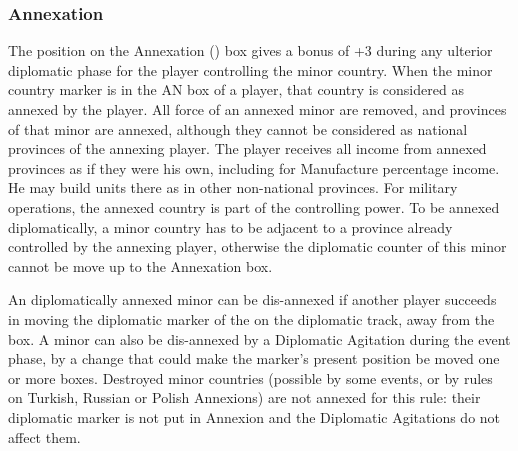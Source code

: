 \subsubsection{Annexation}
\aparag The position on the Annexation (\ANNEXION) box gives a bonus of +3
during any ulterior diplomatic phase for the player controlling the minor
country.  When the minor country marker is in the AN box of a player, that
country is considered as annexed by the player.
All force of an annexed minor are removed, and provinces of that minor are
annexed, although they cannot be considered as national provinces of the
annexing player.
\bparag The player receives all income from annexed provinces as if they were
his own, including for Manufacture percentage income.
\bparag He may build units there as in other non-national provinces.
\bparag For military operations, the annexed country is part of the
controlling power.
To be annexed diplomatically, a minor country has to be adjacent to a province
already controlled by the annexing player, otherwise the diplomatic counter of
this minor cannot be move up to the Annexation box.

An diplomatically annexed minor can be dis-annexed if another player succeeds
in moving the diplomatic marker of the \MIN on the diplomatic track, away from
the \ANNEXION box.
\bparag A minor can also be dis-annexed by a Diplomatic Agitation during the
event phase, by a change that could make the marker's present position be
moved one or more boxes.
\bparag Destroyed minor countries (possible by some events, or by rules on
Turkish, Russian or Polish Annexions) are not annexed for this rule: their
diplomatic marker is not put in Annexion and the Diplomatic Agitations do not
affect them.


